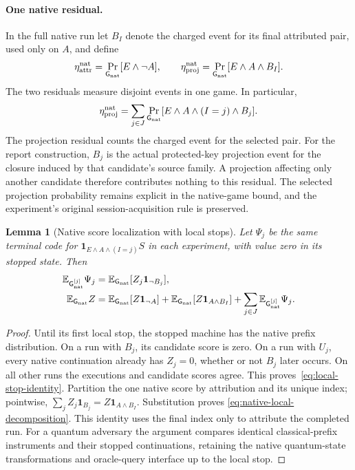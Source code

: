 \documentclass[pdflatex]{sn-jnl}
\theoremstyle{thmstyleone}
\newtheorem{lemma}[theorem]{Lemma}
\theoremstyle{thmstylethree}
\theoremstyle{thmstyletwo}
\begin{document}
\paragraph{One native residual.}
In the full native run let $B_I$ denote the charged event for its final
attributed pair, used only on $A$, and define
\[
 \eta_{\rm attr}^{\rm nat}=\Pr_{\mathsf G_{\rm nat}}[E\land\neg A],
 \qquad
 \eta_{\rm proj}^{\rm nat}=\Pr_{\mathsf G_{\rm nat}}[E\land A\land B_I].
\]
The two residuals measure disjoint events in one game. In particular,
\[
 \eta_{\rm proj}^{\rm nat}
 =\sum_{j\in J}\Pr_{\mathsf G_{\rm nat}}
       [E\land A\land(I=j)\land B_j].
\]
The projection residual counts the charged event for the selected pair. For
the report construction, $B_j$ is the actual protected-key projection event
for the closure induced by that candidate's source family. A projection
affecting only another candidate therefore contributes nothing to this
residual. The selected projection probability remains explicit in the
native-game bound, and the experiment's original session-acquisition rule
is preserved.

\begin{lemma}[Native score localization with local stops]
\label{lem:native-local-score}
Let $\Psi_j$ be the same terminal code for
$\mathbf1_{E\land A\land(I=j)}S$ in each experiment, with value zero in its
stopped state.  Then
\begin{align}
 \mathbb E_{\mathsf G_{\rm nat}^{[j]}}\Psi_j
   &=\mathbb E_{\mathsf G_{\rm nat}}
           [Z_j\mathbf1_{\neg B_j}], \label{eq:local-stop-identity}\\
 \mathbb E_{\mathsf G_{\rm nat}}Z
   &=\mathbb E_{\mathsf G_{\rm nat}}[Z\mathbf1_{\neg A}]
     +\mathbb E_{\mathsf G_{\rm nat}}[Z\mathbf1_{A\land B_I}]
     +\sum_{j\in J}
       \mathbb E_{\mathsf G_{\rm nat}^{[j]}}\Psi_j.
       \label{eq:native-local-decomposition}
\end{align}
\end{lemma}
\begin{proof}
Until its first local stop, the stopped machine has the native prefix
distribution.  On a run with $B_j$, its candidate score is zero.  On a run
with $U_j$, every native continuation already has $Z_j=0$, whether or not
$B_j$ later occurs.  On all other runs the executions and candidate scores
agree.  This proves~\eqref{eq:local-stop-identity}.  Partition the one native
score by attribution and its unique index; pointwise,
$\sum_j Z_j\mathbf1_{B_j}=Z\mathbf1_{A\land B_I}$.  Substitution proves
\eqref{eq:native-local-decomposition}. This identity uses the final index
only to attribute the completed run. For a quantum adversary the
argument compares identical classical-prefix instruments and their stopped
continuations, retaining the native quantum-state transformations and
oracle-query interface up to the local stop.
\end{proof}
\end{document}
